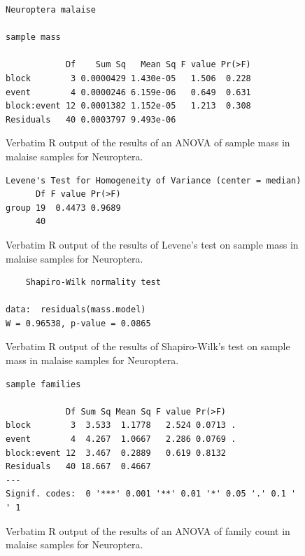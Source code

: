 \documentclass[10pt,letterpaper,twocolumn]{article}
\begin{document}
\begin{figure}[h]
	\lstset{numbers=left}
	\lstset{xleftmargin=5mm,framexleftmargin=5mm}
	\begin{lstlisting}
Neuroptera malaise 

sample mass 

            Df    Sum Sq   Mean Sq F value Pr(>F)
block        3 0.0000429 1.430e-05   1.506  0.228
event        4 0.0000246 6.159e-06   0.649  0.631
block:event 12 0.0001382 1.152e-05   1.213  0.308
Residuals   40 0.0003797 9.493e-06               
	\end{lstlisting}
	\caption{Verbatim R output of the results of an ANOVA of sample mass in malaise samples for Neuroptera.}
	\label{fig:malaise_neuroptera_mass_anova}
	\smallskip
	\nointerlineskip
	\hrulefill
\end{figure}

\begin{figure}[h]
	\lstset{numbers=left}
	\lstset{xleftmargin=5mm,framexleftmargin=5mm}
	\begin{lstlisting}
Levene's Test for Homogeneity of Variance (center = median)
      Df F value Pr(>F)
group 19  0.4473 0.9689
      40               
	\end{lstlisting}
	\caption{Verbatim R output of the results of Levene's test on sample mass in malaise samples for Neuroptera.}
	\label{fig:malaise_neuroptera_mass_levene}
	\smallskip
	\nointerlineskip
	\hrulefill
\end{figure}

\begin{figure}[h]
	\lstset{numbers=left}
	\lstset{xleftmargin=5mm,framexleftmargin=5mm}
	\begin{lstlisting}
	Shapiro-Wilk normality test

data:  residuals(mass.model)
W = 0.96538, p-value = 0.0865
	\end{lstlisting}
	\caption{Verbatim R output of the results of Shapiro-Wilk's test on sample mass in malaise samples for Neuroptera.}
	\label{fig:malaise_neuroptera_mass_shapiro}
	\smallskip
	\nointerlineskip
	\hrulefill
\end{figure}

\begin{figure}[h]
	\lstset{numbers=left}
	\lstset{xleftmargin=5mm,framexleftmargin=5mm}
	\begin{lstlisting}
sample families 

            Df Sum Sq Mean Sq F value Pr(>F)  
block        3  3.533  1.1778   2.524 0.0713 .
event        4  4.267  1.0667   2.286 0.0769 .
block:event 12  3.467  0.2889   0.619 0.8132  
Residuals   40 18.667  0.4667                 
---
Signif. codes:  0 '***' 0.001 '**' 0.01 '*' 0.05 '.' 0.1 ' ' 1
	\end{lstlisting}
	\caption{Verbatim R output of the results of an ANOVA of family count in malaise samples for Neuroptera.}
	\label{fig:malaise_neuroptera_family_anova}
	\smallskip
	\nointerlineskip
	\hrulefill
\end{figure}
\end{document}
